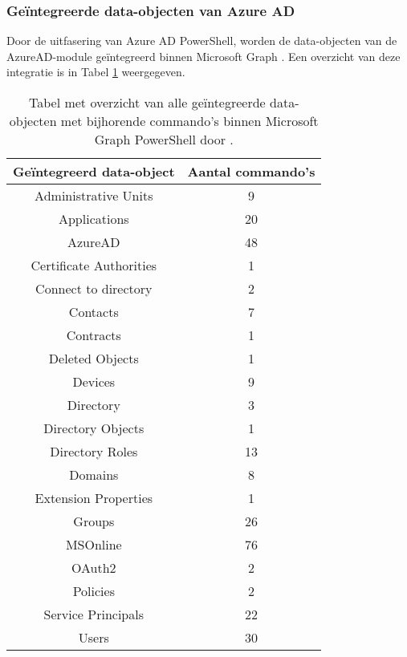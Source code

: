 \subsubsection{Geïntegreerde data-objecten van Azure AD}


Door de uitfasering van Azure \ac{AD} PowerShell, worden de data-objecten van de AzureAD-module geïntegreerd binnen Microsoft Graph \autocite{Microsoft2023l}. Een overzicht van deze integratie is in Tabel \ref{MSGDOT} weergegeven.

\begin{table}
    \small
    \centering
    \begin{tabular}{ |c|c| } 
        \hline
        \textbf{Geïntegreerd data-object} & \textbf{Aantal commando's} \\
        \hline
        Administrative Units & 9 \\ 
        Applications & 20 \\ 
        AzureAD & 48 \\ 
        Certificate Authorities & 1 \\ 
        Connect to directory & 2 \\ 
        Contacts & 7 \\ 
        Contracts & 1 \\ 
        Deleted Objects & 1 \\ 
        Devices & 9 \\    
        Directory & 3 \\
        Directory Objects & 1 \\ 
        Directory Roles & 13 \\ 
        Domains & 8 \\ 
        Extension Properties & 1 \\ 
        Groups & 26 \\
        MSOnline & 76 \\ 
        OAuth2 & 2 \\ 
        Policies & 2 \\ 
        Service Principals & 22 \\ 
        Users & 30 \\ 
        \hline
    \end{tabular}
    \caption[Tabel geïntegreerde data-objecten]{Tabel met overzicht van alle geïntegreerde data-objecten met bijhorende commando's binnen Microsoft Graph PowerShell door \textcite{Microsoft2023l}.}
    \label{MSGDOT}
\end{table}

